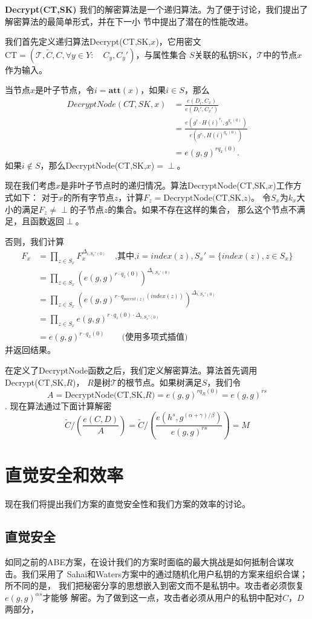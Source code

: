 \vspace{5mm}
\noindent\textbf{Decrypt(CT,SK)}\quad
我们的解密算法是一个递归算法。为了便于讨论，我们提出了解密算法的最简单形式，并在下一小
节中提出了潜在的性能改进。\par
我们首先定义递归算法Decrypt(CT,SK,$x$)，它用密文
$\textrm{CT}=(\mathcal{T},\widetilde{C},C,\forall y\in Y:\quad C_y,C_y')$，与属性集合
$S$关联的私钥SK，$\mathcal{T}$中的节点$x$作为输入。\par
当节点$x$是叶子节点，令$i=\textbf{att}(x)$，如果$i\in S$，那么
\begin{equation*}
\begin{split}
DecryptNode(CT,SK,x) &= \frac{e(D_i,C_x)}{e(D_i',C_x')}\\
&=\frac{e(g^r\cdot H(i)^{r_i},g^{q_x(0)})}{e(g^{r_i},H(i)^{q_x(0)})}\\
&=e(g,g)^{rq_x(0)}.
\end{split}
\end{equation*}
如果$i\notin S$，那么DecryptNode(CT,SK,$x$)$=\perp$。\par
现在我们考虑$x$是非叶子节点时的递归情况。算法DecryptNode(CT,SK,$x$)工作方式如下：
对于$x$的所有字节点$z$，计算$F_z=\textrm{DecryptNode(CT,SK,}z\textrm{)}$。
令$S_x$为$k_x$大小的满足$F_z\neq \perp$的子节点$z$的集合。如果不存在这样的集合，
那么这个节点不满足，且函数返回$\perp$。\par
否则，我们计算
\begin{equation*}
\begin{split}
F_x &=\prod_{z\in S_x}F_x^{\Delta_{i,S_x'(0)}}
\quad \text{,其中,$i=index(z),S_x'=\{index(z),z\in S_x\}$}\\
&=\prod_{z\in S_x}(e(g,g)^{r\cdot q_z(0)})^{\Delta_{i,S_x'(0)}}\\
&=\prod_{z\in S_x}(e(g,g)^{r\cdot q_{parent(z)}(index(z))})^{\Delta_{i,S_x'(0)}}\\
&=\prod_{z\in S_x}e(g,g)^{r\cdot q_z(0)\cdot \Delta_{i,S_x'(0)}}\\
&=e(g,g)^{r\cdot q_x(0)} \qquad \text{(使用多项式插值)}
\end{split}
\end{equation*}
并返回结果。\par
在定义了DecryptNode函数之后，我们定义解密算法。算法首先调用Decrypt(CT,SK,$R$)，
$R$是树$\mathcal{T}$的根节点。如果树满足$S$，我们令
$$A=\textrm{DecryptNode(CT,SK,}R\textrm{)}=e(g,g)^{rq_R(0)}=e(g,g)^{rs}$$.
现在算法通过下面计算解密
$$\widetilde{C}/(\frac{e(C,D)}{A})=
\widetilde{C}/(\frac{e(h^s,g^{(\alpha+\gamma)/\beta})}{e(g,g)^{rs}})=M$$
\section{直觉安全和效率}
现在我们将提出我们方案的直觉安全性和我们方案的效率的讨论。
\subsection{直觉安全}
如同之前的ABE方案，在设计我们的方案时面临的最大挑战是如何抵制合谋攻击。我们采用了
Sahai和Waters方案\cite{SW:FuzzyIBE}中的通过随机化用户私钥的方案来组织合谋；所不同的是，
我们把秘密分享的思想嵌入到密文而不是私钥中。攻击者必须恢复$e(g,g)^{\alpha s}$才能够
解密。为了做到这一点，攻击者必须从用户的私钥中配对$C$，$D$两部分，









